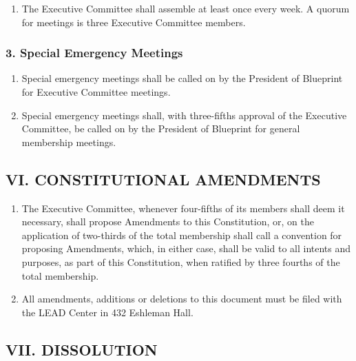 \documentclass[
]{article}
\providecommand{\tightlist}{%
  \setlength{\itemsep}{0pt}\setlength{\parskip}{0pt}}
\begin{document}
\begin{enumerate}
\def\labelenumi{\arabic{enumi}.}
\tightlist
\item
  The Executive Committee shall assemble at least once every week. A
  quorum for meetings is three Executive Committee members.
\end{enumerate}

\hypertarget{special-emergency-meetings}{%
\subsubsection{3. Special Emergency
Meetings}\label{special-emergency-meetings}}

\begin{enumerate}
\def\labelenumi{\arabic{enumi}.}
\tightlist
\item
  Special emergency meetings shall be called on by the President of
  Blueprint for Executive Committee meetings.
\item
  Special emergency meetings shall, with three-fifths approval of the
  Executive Committee, be called on by the President of Blueprint for
  general membership meetings.
\end{enumerate}

\hypertarget{vi.-constitutional-amendments}{%
\subsection{VI. CONSTITUTIONAL
AMENDMENTS}\label{vi.-constitutional-amendments}}

\begin{enumerate}
\def\labelenumi{\arabic{enumi}.}
\tightlist
\item
  The Executive Committee, whenever four-fifths of its members shall
  deem it necessary, shall propose Amendments to this Constitution, or,
  on the application of two-thirds of the total membership shall call a
  convention for proposing Amendments, which, in either case, shall be
  valid to all intents and purposes, as part of this Constitution, when
  ratified by three fourths of the total membership.
\item
  All amendments, additions or deletions to this document must be filed
  with the LEAD Center in 432 Eshleman Hall.
\end{enumerate}

\hypertarget{vii.-dissolution}{%
\subsection{VII. DISSOLUTION}\label{vii.-dissolution}}
\end{document}
